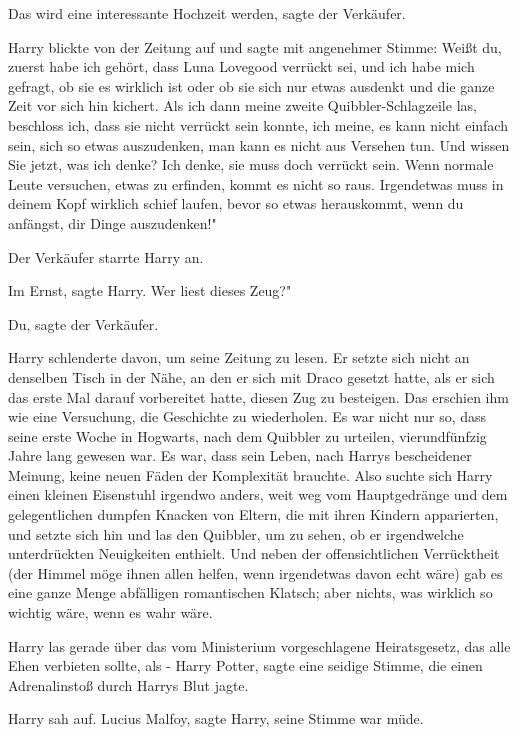 \glqq{}Das wird eine interessante Hochzeit werden\grqq{}, sagte der Verkäufer.

Harry blickte von der Zeitung auf und sagte mit angenehmer Stimme: \glqq{}Weißt
du, zuerst habe ich gehört, dass Luna Lovegood verrückt sei, und ich habe mich
gefragt, ob sie es wirklich ist oder ob sie sich nur etwas ausdenkt und die
ganze Zeit vor sich hin kichert. Als ich dann meine zweite Quibbler-Schlagzeile
las, beschloss ich, dass sie nicht verrückt sein konnte, ich meine, es kann
nicht einfach sein, sich so etwas auszudenken, man kann es nicht aus Versehen
tun. Und wissen Sie jetzt, was ich denke? Ich denke, sie muss doch verrückt
sein. Wenn normale Leute versuchen, etwas zu erfinden, kommt es nicht so raus.
Irgendetwas muss in deinem Kopf wirklich schief laufen, bevor so etwas
herauskommt, wenn du anfängst, dir Dinge auszudenken!"

Der Verkäufer starrte Harry an.

\glqq{}Im Ernst\grqq{}, sagte Harry. \glqq{}Wer liest dieses Zeug?"

\glqq{}Du\grqq{}, sagte der Verkäufer.

Harry schlenderte davon, um seine Zeitung zu lesen. Er setzte sich nicht an
denselben Tisch in der Nähe, an den er sich mit Draco gesetzt hatte, als er sich
das erste Mal darauf vorbereitet hatte, diesen Zug zu besteigen. Das erschien
ihm wie eine Versuchung, die Geschichte zu wiederholen. Es war nicht nur so,
dass seine erste Woche in Hogwarts, nach dem Quibbler zu urteilen,
vierundfünfzig Jahre lang gewesen war. Es war, dass sein Leben, nach Harrys
bescheidener Meinung, keine neuen Fäden der Komplexität brauchte. Also suchte
sich Harry einen kleinen Eisenstuhl irgendwo anders, weit weg vom Hauptgedränge
und dem gelegentlichen dumpfen Knacken von Eltern, die mit ihren Kindern
apparierten, und setzte sich hin und las den Quibbler, um zu sehen, ob er
irgendwelche unterdrückten Neuigkeiten enthielt. Und neben der offensichtlichen
Verrücktheit (der Himmel möge ihnen allen helfen, wenn irgendetwas davon echt
wäre) gab es eine ganze Menge abfälligen romantischen Klatsch; aber nichts, was
wirklich so wichtig wäre, wenn es wahr wäre.

Harry las gerade über das vom Ministerium vorgeschlagene Heiratsgesetz, das alle
Ehen verbieten sollte, als - \glqq{}Harry Potter\grqq{}, sagte eine seidige
Stimme, die einen Adrenalinstoß durch Harrys Blut jagte.

Harry sah auf. \glqq{}Lucius Malfoy\grqq{}, sagte Harry, seine Stimme war müde.

